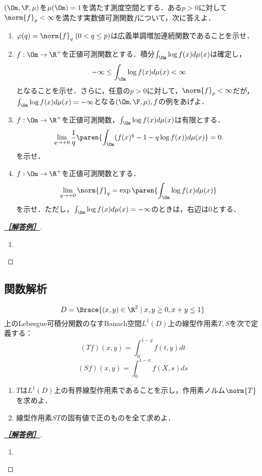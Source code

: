 \documentclass[uplatex,dvipdfmx]{jsarticle}
\begin{document}
\begin{tcolorbox}[colframe=ForestGreen, colback=ForestGreen!10!white,breakable,colbacktitle=ForestGreen!40!white,coltitle=black,fonttitle=\bfseries\sffamily,
    title=B 第9問（実解析）]
    $(\Om,\F,\mu)$を$\mu(\Om)=1$を満たす測度空間とする．ある$p>0$に対して$\norm{f}_p<\infty$を満たす実数値可測関数$f$について，次に答えよ．
    \begin{enumerate}
        \item $\varphi(q)=\norm{f}_q\;(0<q\le p)$は広義単調増加連続関数であることを示せ．
        \item $f:\Om\to\R^+$を正値可測関数とする．積分$\int_\Om\log f(x)d\mu(x)$は確定し，
        \[-\infty\le\int_\Om\log f(x)d\mu(x)<\infty\]
        となることを示せ．さらに，任意の$p>0$に対して，$\norm{f}_p<\infty$だが，$\int_\Om\log f(x)d\mu(x)=-\infty$となる$(\Om,\F,\mu),f$の例をあげよ．
        \item $f:\Om\to\R^+$を正値可測関数，$\int_\Om\log f(x)d\mu(x)$は有限とする．
        \[\lim_{q\to+0}\frac{1}{q}\paren{\int_\Om(f(x)^q-1-q\log f(x))d\mu(x)}=0.\]
        を示せ．
        \item $f:\Om\to\R^+$を正値可測関数とする．
        \[\lim_{q\to+0}\norm{f}_q=\exp\paren{\int_\Om\log f(x)d\mu(x)}\]
        を示せ．ただし，$\int_\Om\log f(x)d\mu(x)=-\infty$のときは，右辺は$0$とする．
    \end{enumerate}
\end{tcolorbox}
\begin{proof}[\textbf{\underline{［解答例］}}]\mbox{}
    \begin{enumerate}
        \item 
    \end{enumerate}
\end{proof}

\subsection{関数解析}

\begin{tcolorbox}[colframe=ForestGreen, colback=ForestGreen!10!white,breakable,colbacktitle=ForestGreen!40!white,coltitle=black,fonttitle=\bfseries\sffamily,
    title=B 第10問（関数解析）]
    \[D=\Brace{(x,y)\in\R^2\mid x,y\ge0,x+y\le 1}\]
    上のLebesgue可積分関数のなすBanach空間$L^1(D)$上の線型作用素$T,S$を次で定義する：
    \[(Tf)(x,y)=\int^{1-y}_0f(t,y)dt\]
    \[(Sf)(x,y)=\int^{1-x}_0f(X,s)ds\]
    \begin{enumerate}
        \item $T$は$L^1(D)$上の有界線型作用素であることを示し，作用素ノルム$\norm{T}$を求めよ．
        \item 線型作用素$ST$の固有値で正のものを全て求めよ．
    \end{enumerate}
\end{tcolorbox}
\begin{proof}[\textbf{\underline{［解答例］}}]\mbox{}
    \begin{enumerate}
        \item 
    \end{enumerate}
\end{proof}
\end{document}
